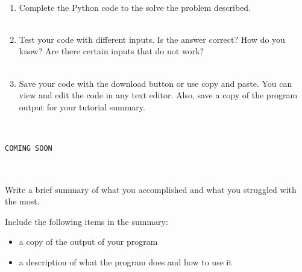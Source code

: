 \documentclass[12pt]{article}
\begin{document}
\begin{description}[labelindent=1cm]
\begin{lstlisting}
	
	\end{lstlisting}
		


	\item[\textbf{\underline{Part 3 - Testing:}}] \hfill \vspace{0mm}
	\begin{enumerate}
	
		\item Complete the Python code to the solve the problem described. \\\\
		
		\item Test your code with different inputs. Is the answer correct? How do you know? Are there certain inputs that do not work? \\\\
		
		\item Save your code with the download button or use copy and paste. You can view and edit the code in any text editor. Also, save a copy of the program output for your tutorial summary. \\\\

	\end{enumerate}

\newpage
\item[\textbf{\underline{Solution Code:}}] \hfill \vspace{0mm}

\begin{lstlisting}

COMING SOON
	
\end{lstlisting}

\item[\textbf{\underline{Tutorial Summary:}}] \hfill \vspace{3mm}\\ 
Write a brief summary of what you accomplished and what you struggled with the most. 

Include the following items in the summary:
\begin{itemize}

\item a copy of the output of your program
\item a description of what the program does and how to use it

\end{itemize}



\end{description}
\end{document}
